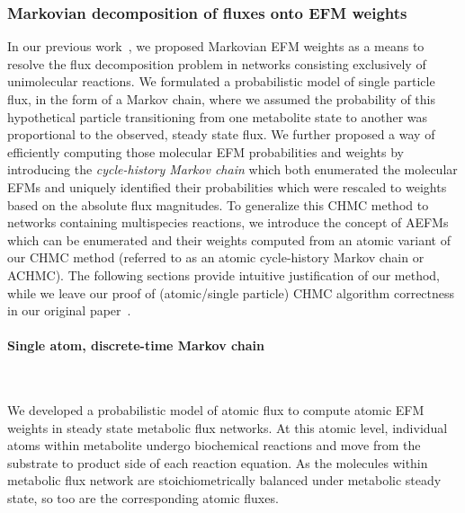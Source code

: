 \documentclass[12pt]{article}
\begin{document}
\subsubsection*{Markovian decomposition of fluxes onto EFM weights} %

In our previous work~\citep{ChitpinJustinG2023AMct}, we proposed Markovian
EFM weights as a means to resolve the flux decomposition problem in
networks consisting exclusively of unimolecular reactions. We formulated
a probabilistic model of single particle flux, in the form of a Markov
chain, where we assumed the probability of this hypothetical particle
transitioning from one metabolite state to another was proportional to the
observed, steady state flux. We further proposed a way of efficiently
computing those molecular EFM probabilities and weights by introducing the
\emph{cycle-history Markov chain} which both enumerated the molecular EFMs
and uniquely identified their probabilities which were rescaled to weights
based on the absolute flux magnitudes. To generalize this CHMC method to
networks containing multispecies reactions, we introduce the concept of
AEFMs which can be enumerated and their weights computed from an atomic
variant of our CHMC method (referred to as an atomic cycle-history Markov
chain or ACHMC). The following sections provide intuitive justification of
our method, while we leave our proof of (atomic/single particle) CHMC
algorithm correctness in our original
paper~\citep{ChitpinJustinG2023AMct}.


\paragraph*{Single atom, discrete-time Markov chain}

\hspace*{0.1cm}\\\noindent

We developed a probabilistic model of atomic flux to compute atomic EFM
weights in steady state metabolic flux networks. At this atomic level,
individual atoms within metabolite undergo biochemical reactions and move
from the substrate to product side of each reaction equation. As the
molecules within metabolic flux network are stoichiometrically balanced
under metabolic steady state, so too are the corresponding atomic fluxes.
\end{document}
